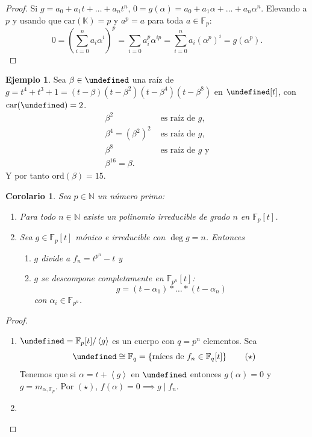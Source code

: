 \documentclass[10pt, spanish]{report}
\newtheorem*{cor}{Corolario}
\theoremstyle{definition}
\newtheorem*{ej}{Ejemplo}
\newcommand{\N}{\mathbb{N}}
\newcommand{\F}{\mathbb{F}}
\newcommand{\K}{\mathbb{K}}
\let\L\undefined
\newcommand{\L}{\mathbb{L}}
\newcommand{\car}[1]{\text{car}(#1)}
\newcommand{\ord}[1]{\text{ord}(#1)}
\newcommand{\completar}{\fbox{\textbf{¡Completar!}}}
\begin{document}
\begin{proof}
    Si $g=a_0+a_1t+\ldots+a_nt^n$,
    $0=g(\alpha)=a_0+a_1\alpha+\ldots+a_n\alpha^n$. Elevando a $p$ y usando que
    $\car{\K}=p$ y $a^p=a$ para toda $a\in\F_p$:   
    \[0=(\sum_{i=0}^n a_i\alpha^i)^p=\sum_{i=0}a_i^p\alpha^{ip}=\sum_{i=0}^n
        a_i(\alpha^p)^i=g(\alpha^p).\]   
\end{proof}

\begin{ej}
    Sea $\beta\in\L$ una raíz de $g=t^4+t^3+1=(t-\beta)(t-\beta^2)(t-\beta^4)
    (t-\beta^8)$ en $\L[t]$, con $\car{\L}=2$.
    \begin{align*}
        \beta^2 &\text{ es raíz de } g,\\
        \beta^4=(\beta^2)^2 &\text{ es raíz de } g,\\
        \beta^8 &\text{ es raíz de } g \text{ y}\\
        \beta^16=\beta.
    \end{align*}
    Y por tanto $\ord{\beta}=15$.
\end{ej}

\begin{cor}
    Sea $p \in\N$ un número primo:
    \begin{enumerate}
        \item  Para todo $n\in\N$ existe un polinomio irreducible de grado $n$
            en $\F_p[t]$.
        \item Sea $g\in\F_p[t]$ mónico e irreducible con $\deg{g}=n$. Entonces
            \begin{enumerate}
                \item $g$ divide a $f_n=t^{p^n}-t$ y
                \item  $g$ se descompone completamente en $\F_{p^n}[t]$:
                    \[g=(t-\alpha_1)*\ldots*(t-\alpha_n)\] 
                    con $\alpha_i\in\F_{p^n}$.
            \end{enumerate}
    \end{enumerate}
\end{cor}

\begin{proof}\hspace{0pt}
    \begin{enumerate}
        \item  $\L=\F_p[t]/\left<g\right>$  es un cuerpo con $q=p^n$ elementos.
            Sea
            \begin{equation}
                \L\cong\F_q=\left\{ \text{raíces de }f_n\in\F_q[t]\right\}
                \tag{$\star$}
            \end{equation}
            Tenemos que si $\alpha=t+\left< g \right> $ en $\L$ entonces
            $g(\alpha)=0$ y $g=m_{\alpha,\F_p}$. Por $\left( \star \right)$,
            $f(\alpha)=0\implies g\mid f_n$.
        \item \completar %
    \end{enumerate}
\end{proof}
\end{document}
